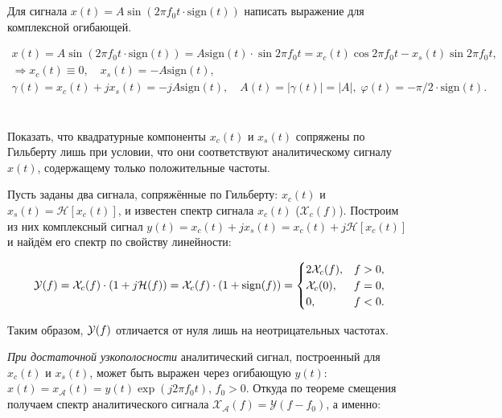 \protect\thispagestyle{fancy}
\section{}
Для сигнала $x(t) = A\sin \left(2\pi f_0 t \cdot \text{sign} (t)\right)$ написать выражение для комплексной огибающей.

\begin{gather*}
x(t) = A\sin \left(2\pi f_0 t \cdot \text{sign} (t)\right) = A\text{sign}(t) \cdot \sin 2\pi f_0 t = x_c(t) \cos 2\pi f_0 t - x_s(t) \sin 2\pi f_0 t,\\
\Rightarrow x_c(t) \equiv 0,\quad x_s(t) = -A \text{sign}(t),\\
\gamma(t) = x_c(t) + jx_s(t) = -jA\text{sign}(t),\quad A(t) = |\gamma(t)| = |A|,\; \varphi(t) = -\pi/2\cdot\text{sign}(t).
\end{gather*}

\section{}
Показать, что квадратурные компоненты $x_c(t)$ и $x_s(t)$ сопряжены по Гильберту лишь при условии, что они соответствуют аналитическому сигналу $x(t)$, содержащему только положительные частоты.

\vspace{0.5cm}
Пусть заданы два сигнала, сопряжённые по Гильберту: $x_c(t)$ и $x_s(t) = \mathcal{H}[x_c(t)]$, и известен спектр сигнала $x_c(t)$ ($\mathcal{X}_c(f)$).
Построим из них комплексный сигнал $y(t) = x_c(t) + jx_s(t) = x_c(t) + j\mathcal{H}[x_c(t)]$ и найдём его спектр по свойству линейности:

\begin{equation*}
\mathcal{Y}(f) = \mathcal{X}_c(f)\cdot (1 + j\mathcal{H}(f)) = \mathcal{X}_c(f)\cdot (1 + \text{sign}(f)) =
\begin{cases}
2\mathcal{X}_c(f),& f>0,\\
\mathcal{X}_c(0),& f=0,\\
0,& f<0.
\end{cases}
\end{equation*}

Таким образом, $\mathcal{Y}(f)$ отличается от нуля лишь на неотрицательных частотах. 

\textit{При достаточной узкополосности} аналитический сигнал, построенный для $x_c(t)$ и $x_s(t)$, может быть выражен через огибающую $y(t)$: $x(t) = x_\mathcal{A}(t) = y(t)\exp(j2\pi f_0 t)$, $f_0 > 0$. Откуда по теореме смещения получаем спектр аналитического сигнала $\mathcal{X}_{\mathcal{A}}(f) = \mathcal{Y}(f - f_0)$, а именно:

